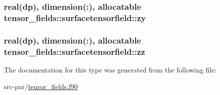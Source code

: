 \hypertarget{structtensor__fields_1_1surfacetensorfield_a305ae7bb81e4deebe5c6148253bd0d0a}{
\subsubsection[{zy}]{\setlength{\rightskip}{0pt plus 5cm}real(dp), dimension(\-:), allocatable tensor\-\_\-fields\-::surfacetensorfield\-::zy}}\label{structtensor__fields_1_1surfacetensorfield_a305ae7bb81e4deebe5c6148253bd0d0a}
\hypertarget{structtensor__fields_1_1surfacetensorfield_abf03f0d86f229b24f77e106becf6ffae}{
\subsubsection[{zz}]{\setlength{\rightskip}{0pt plus 5cm}real(dp), dimension(\-:), allocatable tensor\-\_\-fields\-::surfacetensorfield\-::zz}}\label{structtensor__fields_1_1surfacetensorfield_abf03f0d86f229b24f77e106becf6ffae}


The documentation for this type was generated from the following file\-:\begin{DoxyCompactItemize}
\item 
src-\/par/\hyperlink{tensor__fields_8f90}{tensor\-\_\-fields.\-f90}\end{DoxyCompactItemize}
